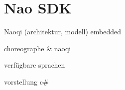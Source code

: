 \section{Nao SDK}
Naoqi (architektur, modell)
	embedded
	
choreographe \& naoqi	


verfügbare sprachen


vorstellung c\#